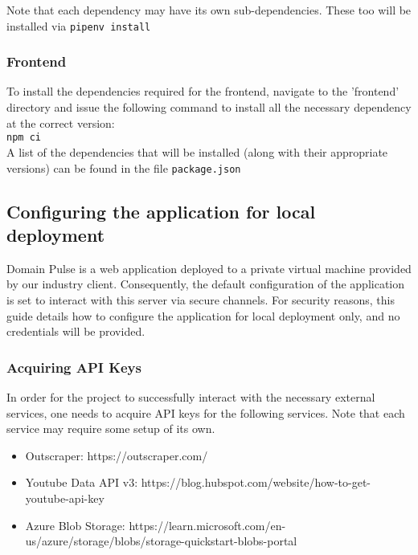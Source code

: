 \documentclass[12pt]{article}
\begin{document}
Note that each dependency may have its own sub-dependencies. These too will be installed via \texttt{pipenv install}

\subsubsection{Frontend}
To install the dependencies required for the frontend, navigate to the 'frontend' directory and issue the following command to install
all the necessary dependency at the correct version: \\
\texttt{npm ci}\\
A list of the dependencies that will be installed (along with their appropriate versions) can be found in the file \texttt{package.json}


\subsection{Configuring the application for local deployment}
Domain Pulse is a web application deployed to a private virtual machine provided by our industry client. Consequently, the default
configuration of the application is set to interact with this server via secure channels. For security reasons, this guide details how to configure
the application for local deployment only, and no credentials will be provided.

\subsubsection{Acquiring API Keys}
In order for the project to successfully interact with the necessary external services, one needs to acquire API keys for the following services.
Note that each service may require some setup of its own.
\begin{itemize}
    \item Outscraper: https://outscraper.com/
    \item Youtube Data API v3: https://blog.hubspot.com/website/how-to-get-youtube-api-key
    \item Azure Blob Storage: https://learn.microsoft.com/en-us/azure/storage/blobs/storage-quickstart-blobs-portal
\end{itemize}
\end{document}
